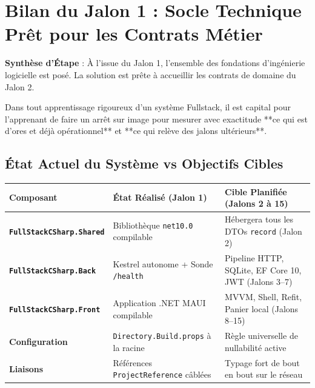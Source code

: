 \section{Bilan du Jalon 1 : Socle Technique Prêt pour les Contrats Métier}

\begin{tcolorbox}[colback=emerald!4!white,colframe=emerald!40!white,arc=2mm,boxrule=0.8pt,top=2mm,bottom=2mm,left=3mm,right=3mm]
    \small\textbf{\color{emerald!80!black}Synthèse d'Étape} : À l'issue du Jalon 1, l'ensemble des fondations d'ingénierie logicielle est posé. La solution est prête à accueillir les contrats de domaine du Jalon 2.
\end{tcolorbox}

\vspace{0.1cm}

Dans tout apprentissage rigoureux d'un système Fullstack, il est capital pour l'apprenant de faire un arrêt sur image pour mesurer avec exactitude **ce qui est d'ores et déjà opérationnel** et **ce qui relève des jalons ultérieurs**.

\vspace{0.2cm}

\subsection*{État Actuel du Système vs Objectifs Cibles}

\begin{table}[h!]
\centering
\small
\begin{tabularx}{\textwidth}{l p{5.5cm} X}
\toprule
\textbf{Composant} & \textbf{État Réalisé (Jalon 1)} & \textbf{Cible Planifiée (Jalons 2 à 15)} \\
\midrule
\textbf{\texttt{FullStackCSharp.Shared}} & Bibliothèque \texttt{net10.0} compilable & Hébergera tous les DTOs \texttt{record} (Jalon 2) \\
\textbf{\texttt{FullStackCSharp.Back}} & Kestrel autonome + Sonde \texttt{/health} & Pipeline HTTP, SQLite, EF Core 10, JWT (Jalons 3--7) \\
\textbf{\texttt{FullStackCSharp.Front}} & Application .NET MAUI compilable & MVVM, Shell, Refit, Panier local (Jalons 8--15) \\
\textbf{Configuration} & \texttt{Directory.Build.props} à la racine & Règle universelle de nullabilité active \\
\textbf{Liaisons} & Références \texttt{ProjectReference} câblées & Typage fort de bout en bout sur le réseau \\
\bottomrule
\end{tabularx}
\end{table}

